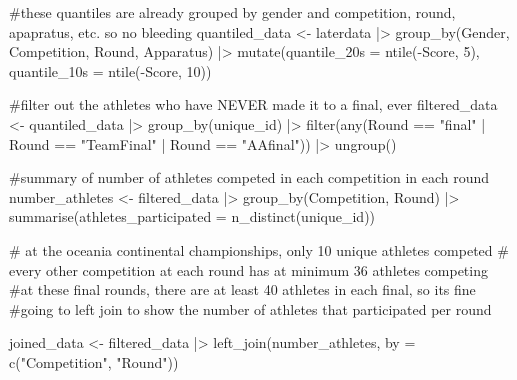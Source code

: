 \documentclass[
  letterpaper,
  DIV=11,
  numbers=noendperiod]{scrartcl}
\newenvironment{Shaded}{\begin{snugshade}}{\end{snugshade}}
\newcommand{\AttributeTok}[1]{\textcolor[rgb]{0.40,0.45,0.13}{#1}}
\newcommand{\CommentTok}[1]{\textcolor[rgb]{0.37,0.37,0.37}{#1}}
\newcommand{\DecValTok}[1]{\textcolor[rgb]{0.68,0.00,0.00}{#1}}
\newcommand{\FunctionTok}[1]{\textcolor[rgb]{0.28,0.35,0.67}{#1}}
\newcommand{\NormalTok}[1]{\textcolor[rgb]{0.00,0.23,0.31}{#1}}
\newcommand{\OtherTok}[1]{\textcolor[rgb]{0.00,0.23,0.31}{#1}}
\newcommand{\SpecialCharTok}[1]{\textcolor[rgb]{0.37,0.37,0.37}{#1}}
\newcommand{\StringTok}[1]{\textcolor[rgb]{0.13,0.47,0.30}{#1}}
\begin{document}
\begin{Shaded}
\begin{Highlighting}[]
\CommentTok{\#these quantiles are already grouped by gender and competition, round, apapratus, etc. so no bleeding}
\NormalTok{quantiled\_data }\OtherTok{\textless{}{-}}\NormalTok{ laterdata }\SpecialCharTok{|\textgreater{}}
  \FunctionTok{group\_by}\NormalTok{(Gender, Competition, Round, Apparatus) }\SpecialCharTok{|\textgreater{}}
  \FunctionTok{mutate}\NormalTok{(}\AttributeTok{quantile\_20s =} \FunctionTok{ntile}\NormalTok{(}\SpecialCharTok{{-}}\NormalTok{Score, }\DecValTok{5}\NormalTok{),}
         \AttributeTok{quantile\_10s =} \FunctionTok{ntile}\NormalTok{(}\SpecialCharTok{{-}}\NormalTok{Score, }\DecValTok{10}\NormalTok{))}

\CommentTok{\#filter out the athletes who have NEVER made it to a final, ever}
\NormalTok{filtered\_data }\OtherTok{\textless{}{-}}\NormalTok{ quantiled\_data }\SpecialCharTok{|\textgreater{}}
  \FunctionTok{group\_by}\NormalTok{(unique\_id) }\SpecialCharTok{|\textgreater{}}
  \FunctionTok{filter}\NormalTok{(}\FunctionTok{any}\NormalTok{(Round }\SpecialCharTok{==} \StringTok{"final"} \SpecialCharTok{|}\NormalTok{ Round }\SpecialCharTok{==} \StringTok{"TeamFinal"} \SpecialCharTok{|}\NormalTok{ Round }\SpecialCharTok{==} \StringTok{"AAfinal"}\NormalTok{)) }\SpecialCharTok{|\textgreater{}}
  \FunctionTok{ungroup}\NormalTok{()}

\CommentTok{\#summary of number of athletes competed in each competition in each round}
\NormalTok{number\_athletes }\OtherTok{\textless{}{-}}\NormalTok{ filtered\_data }\SpecialCharTok{|\textgreater{}}
  \FunctionTok{group\_by}\NormalTok{(Competition, Round) }\SpecialCharTok{|\textgreater{}}
  \FunctionTok{summarise}\NormalTok{(}\AttributeTok{athletes\_participated =} \FunctionTok{n\_distinct}\NormalTok{(unique\_id))}


\CommentTok{\# at the oceania continental championships, only 10 unique athletes competed}
\CommentTok{\# every other competition at each round has at minimum 36 athletes competing}
\CommentTok{\#at these final rounds, there are at least 40 athletes in each final, so it\textquotesingle{}s fine}
\CommentTok{\#going to left join to show the number of athletes that participated per round}

\NormalTok{joined\_data }\OtherTok{\textless{}{-}}\NormalTok{ filtered\_data }\SpecialCharTok{|\textgreater{}}
  \FunctionTok{left\_join}\NormalTok{(number\_athletes, }\AttributeTok{by =} \FunctionTok{c}\NormalTok{(}\StringTok{"Competition"}\NormalTok{, }\StringTok{"Round"}\NormalTok{))}


\end{Highlighting}
\end{Shaded}
\end{document}
